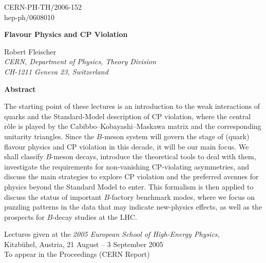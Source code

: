 \documentclass[11pt]{cernrep}
\begin{document}


\thispagestyle{empty}

\begin{flushright}
CERN-PH-TH/2006-152\\
hep-ph/0608010
\end{flushright}

\vspace{1.6truecm}
\begin{center}
\boldmath
\large\bf  Flavour Physics and CP Violation
\unboldmath
\end{center}

\vspace{0.9truecm}
\begin{center}
Robert Fleischer\\[0.1cm]
{\sl CERN, Department of Physics, Theory Division\\
CH-1211 Geneva 23, Switzerland}
\end{center}

\vspace{1.3truecm}

\begin{center}
{\bf Abstract}
\end{center}

{\small
\vspace{0.2cm}\noindent
The starting point of these lectures is an introduction to the weak 
interactions of quarks and the Standard-Model description of CP violation, 
where the central r\^ole is played by the Cabibbo--Kobayashi--Maskawa matrix 
and the corresponding unitarity triangles. Since the $B$-meson system will govern 
the stage of (quark) flavour physics and CP violation in this decade, 
it will be our main focus. We  shall classify $B$-meson decays, introduce the 
theoretical tools to deal with them, investigate the requirements for non-vanishing 
CP-violating asymmetries, and discuss the main strategies to explore
CP violation and the preferred avenues for physics beyond the Standard Model
to enter. This formalism is then applied to discuss the status of important 
$B$-factory benchmark modes, where we focus on puzzling patterns in the
data that may indicate new-physics effects, as well as the prospects for 
$B$-decay studies at the LHC.
}

\vspace{1.5truecm}

\begin{center}
Lectures given at the {\it 2005 European School of High-Energy Physics,}\\
Kitzb\"uhel, Austria, 21 August -- 3 September 2005\\
To appear in the Proceedings (CERN Report)
\end{center}
\end{document}
